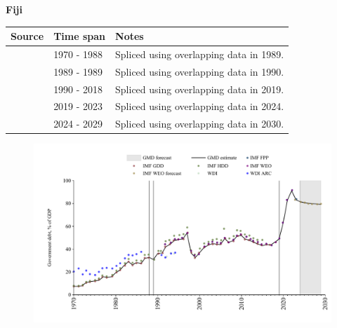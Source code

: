 \documentclass[12pt,a4paper,landscape]{article}
\begin{document}
\begin{adjustbox}{max totalsize={\paperwidth}{\paperheight},center}
\begin{minipage}[t][\textheight][t]{\textwidth}
\vspace*{0.5cm}
{}
\begin{center}
{\Large\bfseries Fiji}
\end{center}
\vspace{0.5cm}
\begin{table}[H]
\centering
\small
\begin{tabular}{|l|l|l|}
\hline
\textbf{Source} & \textbf{Time span} & \textbf{Notes} \\
\hline
\rowcolor{white}\cite{IMF_GDD}& 1970 - 1988 &Spliced using overlapping data in 1989.\\
\rowcolor{lightgray}\cite{IMF_HDD}& 1989 - 1989 &Spliced using overlapping data in 1990.\\
\rowcolor{white}\cite{IMF_GDD}& 1990 - 2018 &Spliced using overlapping data in 2019.\\
\rowcolor{lightgray}\cite{IMF_FPP}& 2019 - 2023 &Spliced using overlapping data in 2024.\\
\rowcolor{white}\cite{IMF_WEO_forecast}& 2024 - 2029 &Spliced using overlapping data in 2030.\\
\hline
\end{tabular}
\end{table}
\begin{figure}[H]
\centering
\includegraphics[width=\textwidth,height=0.6\textheight,keepaspectratio]{graphs/FJI_govdebt_GDP.pdf}
\end{figure}
\end{minipage}
\end{adjustbox}
\end{document}

